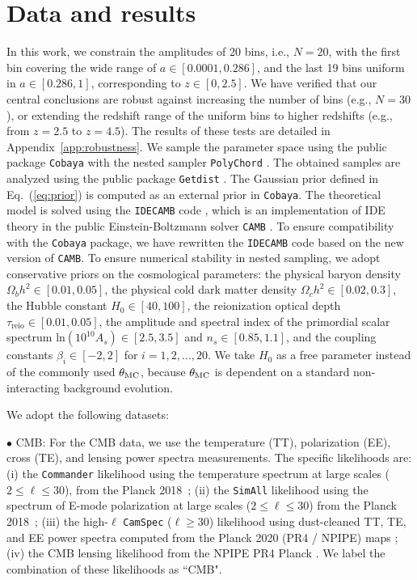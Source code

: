 \documentclass[a4paper,11pt]{article}
\begin{document}
\section{Data and results}\label{sec:Data}
In this work, we constrain the amplitudes of 20 bins, i.e., $N=20$, with the first bin covering the wide range of $a\in[0.0001,0.286]$, and the last 19 bins uniform in $a\in[0.286,1]$, corresponding to $z\in[0,2.5]$. {We have verified that our central conclusions are robust against increasing the number of bins (e.g., $N=30$), or extending the redshift range of the uniform bins to higher redshifts (e.g., from $z=2.5$ to $z=4.5$). The results of these tests are detailed in Appendix~\ref{app:robustness}.} We sample the parameter space using the public package {\tt Cobaya} \cite{Torrado:2020dgo} with the nested sampler {\tt PolyChord} \cite{Handley:2015fda,Handley:2015vkr}. The obtained samples are analyzed using the public package {\tt Getdist} \cite{Lewis:2019xzd}. The Gaussian prior defined in Eq.~(\ref{eq:prior}) is computed as an external prior in {\tt Cobaya}. The theoretical model is solved using the {\tt IDECAMB} code \cite{Li:2023fdk}, which is an implementation of IDE theory in the public Einstein-Boltzmann solver {\tt CAMB} \cite{Lewis:1999bs,Howlett:2012mh}. To ensure compatibility with the {\tt Cobaya} package, we have rewritten the {\tt IDECAMB} code based on the new version of {\tt CAMB}. To ensure numerical stability in nested sampling, we adopt conservative priors on the cosmological parameters: the physical baryon density $\Omega_bh^2 \in [0.01, 0.05]$, the physical cold dark matter density $\Omega_ch^2 \in [0.02, 0.3]$, the Hubble constant $H_0 \in [40, 100]$, the reionization optical depth $\tau_\mathrm{reio} \in [0.01, 0.05]$, the amplitude and spectral index of the primordial scalar spectrum $\mathrm{ln}(10^{10}A_s) \in [2.5, 3.5]$ and $n_s \in [0.85, 1.1]$, and the coupling constants $\beta_i \in [-2, 2]$ for $i=1,2,...,20$. We take $H_0$ as a free parameter instead of the commonly used $\theta_{\rm{MC}}$, because $\theta_{\rm{MC}}$ is dependent on a standard non-interacting background evolution.   



We adopt the following datasets:

$\bullet$ CMB: For the CMB data, we use the temperature (TT), polarization (EE), cross (TE), and lensing power spectra measurements. The specific likelihoods are: (i) the \texttt{Commander} likelihood using the temperature spectrum at large scales ($2 \leq \ell \leq 30$), from the Planck 2018~\cite{Planck:2018vyg,Planck:2019nip}; (ii) the \texttt{SimAll} likelihood using the spectrum of E-mode polarization at large scales ($2 \leq \ell \leq 30$) from the Planck 2018~\cite{Planck:2018vyg,Planck:2019nip}; (iii) the high-$\ell$ \texttt{CamSpec} ($\ell \geq  30$) likelihood using dust-cleaned TT, TE, and EE power spectra computed from the Planck 2020 (PR4 / NPIPE) maps \cite{Rosenberg:2022sdy}; (iv) the CMB lensing likelihood from the NPIPE PR4 Planck \cite{Carron:2022eyg}. We label the combination of these likelihoods as ``CMB". %
\end{document}
